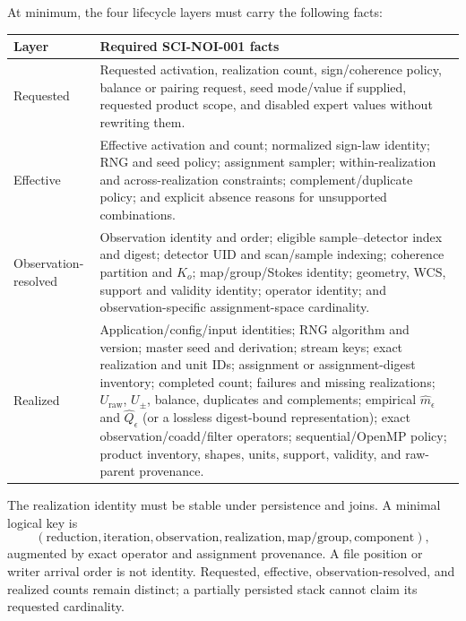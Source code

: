 \documentclass[11pt]{article}
\begin{document}
At minimum, the four lifecycle layers must carry the following facts:
\begin{longtable}{>{\raggedright\arraybackslash}p{}
                  >{\raggedright\arraybackslash}p{}}
\toprule
Layer & Required SCI-NOI-001 facts \\
\midrule
\endhead
Requested & Requested activation, realization count, sign/coherence policy,
balance or pairing request, seed mode/value if supplied, requested product
scope, and disabled expert values without rewriting them. \\
Effective & Effective activation and count; normalized sign-law identity;
RNG and seed policy; assignment sampler; within-realization and
across-realization constraints; complement/duplicate policy; and explicit
absence reasons for unsupported combinations. \\
Observation-resolved & Observation identity and order; eligible
sample--detector index and digest; detector UID and scan/sample indexing;
coherence partition and $K_o$; map/group/Stokes identity; geometry, WCS,
support and validity identity; operator identity; and observation-specific
assignment-space cardinality. \\
Realized & Application/config/input identities; RNG algorithm and version;
master seed and derivation; stream keys; exact realization and unit IDs;
assignment or assignment-digest inventory; completed count; failures and
missing realizations; $U_{\mathrm{raw}}$, $U_{\pm}$, balance, duplicates and
complements; empirical $\widehat m_\epsilon$ and $\widehat Q_\epsilon$ (or a
lossless digest-bound representation); exact observation/coadd/filter
operators; sequential/OpenMP policy; product inventory, shapes, units,
support, validity, and raw-parent provenance. \\
\bottomrule
\end{longtable}

The realization identity must be stable under persistence and joins.  A
minimal logical key is
\begin{equation}
  (\text{reduction},\text{iteration},\text{observation},
   \text{realization},\text{map/group},\text{component}),
  \label{eq:realization-identity}
\end{equation}
augmented by exact operator and assignment provenance.  A file position or
writer arrival order is not identity.  Requested, effective,
observation-resolved, and realized counts remain distinct; a partially
persisted stack cannot claim its requested cardinality.
\end{document}
